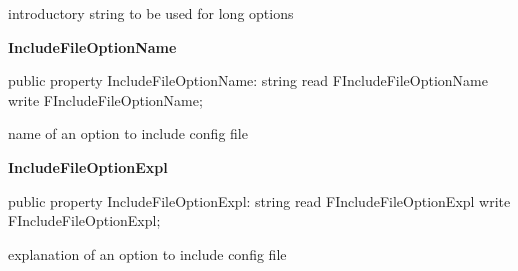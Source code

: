 \documentclass{report}
\newif\ifpdf
\begin{document}
\begin{list}{}
\begin{flushleft}
\ifpdf
\end{flushleft}
\fi


\par introductory string to be used for long options\label{PasDoc_OptionParser.TOptionParser-IncludeFileOptionName}
\item[\textbf{IncludeFileOptionName}\hfill]
\ifpdf
\begin{flushleft}
\fi
\begin{ttfamily}
public property IncludeFileOptionName: string read FIncludeFileOptionName write FIncludeFileOptionName;\end{ttfamily}

\ifpdf
\end{flushleft}
\fi


\par name of an option to include config file\label{PasDoc_OptionParser.TOptionParser-IncludeFileOptionExpl}
\item[\textbf{IncludeFileOptionExpl}\hfill]
\ifpdf
\begin{flushleft}
\fi
\begin{ttfamily}
public property IncludeFileOptionExpl: string read FIncludeFileOptionExpl write FIncludeFileOptionExpl;\end{ttfamily}

\ifpdf
\end{flushleft}
\fi


\par explanation of an option to include config file\end{list}
\end{document}

